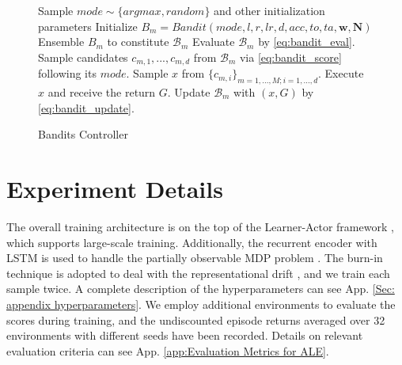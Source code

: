 \documentclass[nohyperref]{article}
\theoremstyle{plain}
\begin{document}
\begin{figure}[ht]
  \centering
  \begin{minipage}{.9\linewidth}
    \begin{algorithm}[H]
      \caption{Bandits Controller}  
          \begin{algorithmic}
                \STATE Sample $mode \sim \{argmax, random\}$ and other initialization parameters
                \STATE Initialize $B_m = Bandit(mode, l, r, lr, d, acc, to, ta, \textbf{w}, \textbf{N})$
                \STATE Ensemble $B_m$ to constitute $\mathcal{B}_m$ 
            \ENDFOR
                    \STATE Evaluate $\mathcal{B}_m$ by \eqref{eq:bandit_eval}.
                    \STATE Sample candidates $c_{m, 1}, ..., c_{m, d}$  from $\mathcal{B}_m$ via \eqref{eq:bandit_score} following its $mode$.
                \ENDFOR
                \STATE Sample $x$ from $\{c_{m, i}\}_{m=1,...,M; i=1,...,d}$.
                \STATE Execute $x$ and receive the return $G$.
                    \STATE Update $\mathcal{B}_m$ with $(x, G)$ by \eqref{eq:bandit_update}.
                \ENDFOR
            \ENDWHILE
          \end{algorithmic}  
        \label{alg:bva}
    \end{algorithm}
  \end{minipage}
\end{figure}


\clearpage


\section{Experiment Details}
\label{sec:app Experiment Details}

The overall training architecture is on the top of the Learner-Actor  framework \citep{impala}, which supports large-scale training. Additionally, the recurrent encoder with LSTM \citep{lstm} is used to handle the partially observable MDP problem \citep{ale}. 
The burn-in technique is adopted to deal with the representational drift \citep{r2d2}, and we train each sample twice.
A complete description of the hyperparameters  can see App. \ref{Sec: appendix hyperparameters}. 
We employ additional environments to evaluate the scores during training, and the undiscounted episode returns averaged over 32 environments with different seeds have been recorded. 
Details on relevant evaluation criteria  can see App. \ref{app:Evaluation Metrics for ALE}.
 
\end{document}
